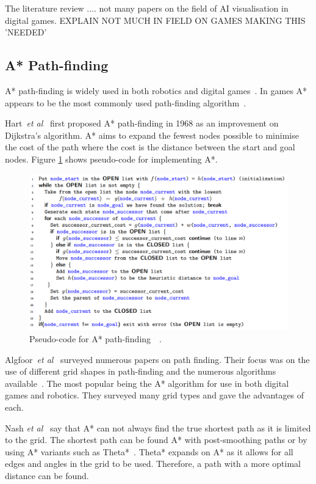 \documentclass[journal]{IEEEtran}
\begin{document}
The literature review .... not many papers on the field of AI visualisation in digital games. 
EXPLAIN NOT MUCH IN FIELD ON GAMES MAKING THIS 'NEEDED'



\subsection{A* Path-finding} \label{A*PF}
A* path-finding is widely used in both robotics and digital games~\cite{Algfoor2015}. In games A* appears to be the most commonly used path-finding algorithm~\cite{Algfoor2015}.

Hart~\textit{et al}~\cite{Hart1968} first proposed A* path-finding in 1968 as an improvement on Dijkstra's algorithm. A* aims to expand the fewest nodes possible to minimise the cost of the path where the cost is the distance between the start and  goal nodes. Figure \ref{A*Pseudo} shows pseudo-code for implementing A*. 

\begin{figure}[H]
	\includegraphics[width=1.0\linewidth]{APseudocode.png}
	\caption{Pseudo-code for A* path-finding~\cite{Hart1968}~\cite{pseudocode:A*}.}
	\label{A*Pseudo}
\end{figure} 

Algfoor~\textit{et al}~\cite{Algfoor2015} surveyed numerous papers on path finding. Their focus was on the use of different grid shapes in path-finding and the numerous algorithms available~\cite{Algfoor2015}. The most popular being the A* algorithm for use in both digital games and robotics. They surveyed many grid types and gave the advantages of each. 

Nash \textit{et al}~\cite{Nash2007} say that A* can not always find the true shortest path as it is limited to the grid. The shortest path can be found A* with post-smoothing paths or by using A* variants such as Theta*~\cite{Nash2007,Firmansyah2016}. Theta* expands on A* as it allows for all edges and angles in the grid to be used. Therefore, a path with a more optimal distance can be found.
\end{document}
